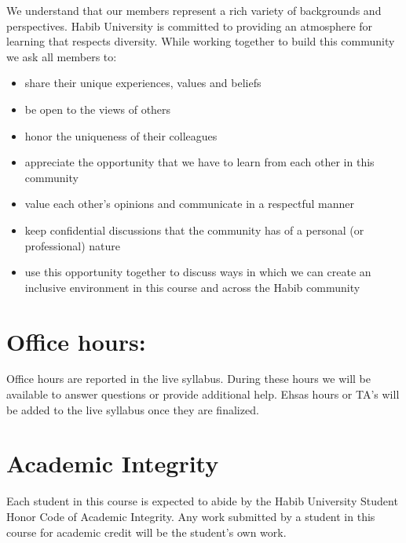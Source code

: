 \documentclass[a4paper]{article}
\begin{document}
We understand that our members represent a rich variety of backgrounds and perspectives. Habib University is committed to providing an atmosphere for learning that respects diversity. While working together to build this community we ask all members to:
\begin{itemize}
\item share their unique experiences, values and beliefs
\item be open to the views of others 
\item honor the uniqueness of their colleagues
\item appreciate the opportunity that we have to learn from each other in this community
\item value each other's opinions and communicate in a respectful manner
\item keep confidential discussions that the community has of a personal (or professional) nature 
\item use this opportunity together to discuss ways in which we can create an inclusive environment in this course and across the Habib community 
\end{itemize}

\section{Office hours:}

Office hours are reported in the live syllabus. During these hours we will be available to answer questions or provide additional help. Ehsas hours or TA's will be added to the live syllabus once they are finalized.

\section{Academic Integrity}

Each student in this course is expected to abide by the Habib University Student Honor Code of Academic Integrity.  Any work submitted by a student in this course for academic credit will be the student's own work.

\end{document}
